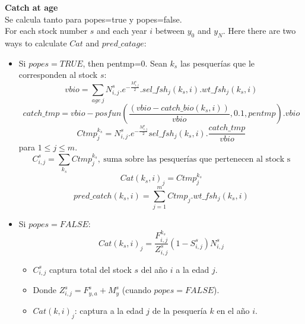 \documentclass{article}
\begin{document}
\textbf{Catch at age}\\
Se calcula tanto para popes=true y popes=false.\\
For each stock number $s$ and  each year $i$ between $y_0$ and $y_N$. Here there are two ways to calculate $Cat$ and $pred\_catage$:
\begin{itemize}
    \item Si $popes=TRUE$, then pentmp=0. Sean  $k_s$ las pesquerías que le corresponden al stock $s$:
        \begin{equation}
        vbio=\sum_{age\ j}N^s_{i,j}.e^{-\frac{M^s_{i,j}}{2}}.sel\_fsh_j(k_s,i).wt\_fsh_j(k_s,i)
    \end{equation}
        \begin{equation}
        catch\_tmp=vbio-posfun\left(\frac{(vbio - catch\_bio(k_s,i))}{vbio} , 0.1 , pentmp \right).vbio
    \end{equation}
    \begin{equation}
        Ctmp^{k_s}_j=N^s_{i,j}.e^{-\frac{M^s_{i,j}}{2}}sel\_fsh_j(k_s,i).\dfrac{catch\_tmp}{vbio}
    \end{equation}
    para $1\leq j \leq m$.
    \begin{equation}
        C^s_{i,j}=\sum_{k_s}Ctmp^{k_s}_j, \ \text{suma sobre las pesquerías que pertenecen al stock s}
    \end{equation}
    \begin{equation}
        Cat(k_s,i)_j=Ctmp^{k_s}_j
    \end{equation}
    \begin{equation}
            pred\_catch(k_s,i)=\sum_{j=1}^{m}Ctmp_j.wt\_fsh_j(k_s,i)
        \end{equation}
    \item Si $popes=FALSE$:
     \begin{equation}
        Cat(k_s,i)_j=\dfrac{F^{k_s}_{i,j}}{Z^s_{i,j}}\left(1-S^s_{i,j}\right)N^s_{i,j}
    \end{equation}
    \begin{itemize}
    \item $C^s_{i,j}$ captura total del stock $s$ del año $i$ a la edad $j$.
        \item %
        Donde $Z^s_{i,j}=F^s_{y,a}+M^{s}_{y}$ (cuando $popes=FALSE$).
        \item $Cat(k,i)_j$: captura a la edad $j$ de la pesquería $k$ en el año $i$.
    \end{itemize}

\end{itemize}
\end{document}
